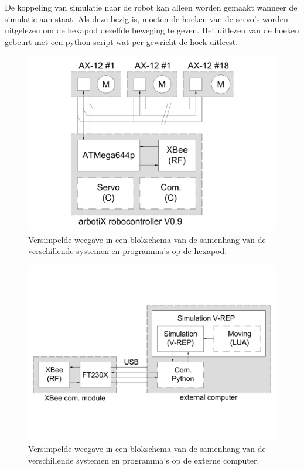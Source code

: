 \documentclass[10pt,a4paper]{article}
\begin{document}
De koppeling van simulatie naar de robot kan alleen worden gemaakt wanneer de simulatie aan staat. Als deze bezig is, moeten de hoeken van de servo's worden uitgelezen om de hexapod dezelfde beweging te geven. Het uitlezen van de hoeken gebeurt met een python script wat per gewricht de hoek uitleest.


\begin{figure}[h]
    \centering
    \includegraphics[width=1\textwidth]{blockschematic-spider}
    \caption{Versimpelde weegave in een blokschema van de samenhang van de verschillende systemen en programma's op de hexapod.}
    \label{fig:blockschematic-spider}
\end{figure}

\begin{figure}[h]
    \centering
    \includegraphics[width=1\textwidth]{blockschematic-computer}
    \caption{Versimpelde weegave in een blokschema van de samenhang van de verschillende systemen en programma's op de externe computer.}
    \label{fig:blockschematic-computer}
\end{figure}
\end{document}
